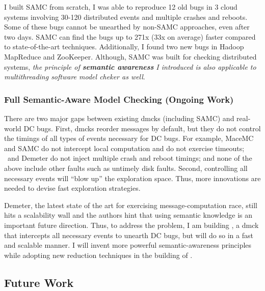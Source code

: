 \documentclass[11pt]{article}
\begin{document}
I built SAMC from scratch, I was able to reproduce 12 old bugs
in 3 cloud systems involving 30-120 distributed events and multiple crashes and
reboots. Some of these bugs cannot be unearthed by non-SAMC approaches, even
after two days. SAMC can find the bugs up to 271x (33x on average) faster
compared to state-of-the-art techniques. Additionally, I found two new bugs in
Hadoop MapReduce and ZooKeeper. Although, SAMC was built for checking
distributed systems, \textit{the principle of \textbf{semantic awareness} I
introduced is also applicable to multithreading software model cheker as well}.

\subsubsection*{Full Semantic-Aware Model Checking (Ongoing Work)} 

There are two major gaps between existing dmcks (including SAMC) and real-world
DC bugs. First, dmcks reorder messages by default, but they do not control the
timings of all types of events necessary for DC bugs. For example, MaceMC
and SAMC do not intercept local computation and do not exercise timeouts;
\modist\ and Demeter do not inject multiple crash and reboot timings; and none
of the above include other faults such as untimely disk faults.
%
Second, controlling all necessary events will ``blow up'' the exploration space.
Thus, more innovations are needed to devise fast exploration strategies.


Demeter, the latest state of the art for exercising message-computation race,
still hits a scalability wall and the authors hint that using semantic knowledge
is an important future direction. Thus, to address the problem, I am building
\fullcheck, a dmck that intercepts all necessary events to unearth DC bugs, but
will do so in a fast and scalable manner. I will invent more powerful
semantic-awareness principles while adopting new reduction techniques in the
building of \fullcheck.



\subsection{Future Work}
\end{document}
